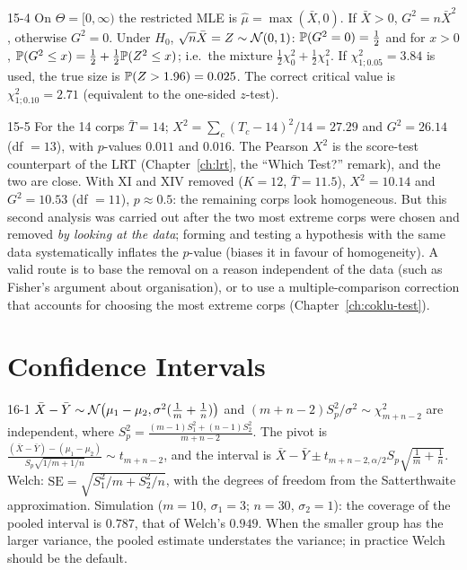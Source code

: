 \begin{solution}{15-4}
On $\Theta=[0,\infty)$ the restricted MLE is $\hat\mu=\max(\bar X,0)$. If $\bar X>0$, $G^2=n\bar X^2$, otherwise $G^2=0$. Under $H_0$, $\sqrt n\bar X=Z\sim\Normal(0,1)$: $\P(G^2=0)=\frac12$ and for $x>0$, $\P(G^2\le x)=\frac12+\frac12\P(Z^2\le x)$; i.e.\ the mixture $\frac12\chi^2_0+\frac12\chi^2_1$. If $\chi^2_{1;0.05}=3.84$ is used, the true size is $\P(Z>1.96)=0.025$. The correct critical value is $\chi^2_{1;0.10}=2.71$ (equivalent to the one-sided $z$-test).
\end{solution}

\begin{solution}{15-5}
For the 14 corps $\bar T=14$; $X^2=\sum_c(T_c-14)^2/14=27.29$ and $G^2=26.14$ (df $=13$), with $p$-values $0.011$ and $0.016$. The Pearson $X^2$ is the score-test counterpart of the LRT (Chapter~\ref{ch:lrt}, the ``Which Test?'' remark), and the two are close. With XI and XIV removed ($K=12$, $\bar T=11.5$), $X^2=10.14$ and $G^2=10.53$ (df $=11$), $p\approx0.5$: the remaining corps look homogeneous. But this second analysis was carried out after the two most extreme corps were chosen and removed \emph{by looking at the data}; forming and testing a hypothesis with the same data systematically inflates the $p$-value (biases it in favour of homogeneity). A valid route is to base the removal on a reason independent of the data (such as Fisher's argument about organisation), or to use a multiple-comparison correction that accounts for choosing the most extreme corps (Chapter~\ref{ch:coklu-test}).
\end{solution}

\section{Confidence Intervals}

\begin{solution}{16-1}
$\bar X-\bar Y\sim\Normal\big(\mu_1-\mu_2,\sigma^2(\frac1m+\frac1n)\big)$ and $(m+n-2)S_p^2/\sigma^2\sim\chi^2_{m+n-2}$ are independent, where $S_p^2=\frac{(m-1)S_1^2+(n-1)S_2^2}{m+n-2}$. The pivot is $\frac{(\bar X-\bar Y)-(\mu_1-\mu_2)}{S_p\sqrt{1/m+1/n}}\sim t_{m+n-2}$, and the interval is
$\bar X-\bar Y\pm t_{m+n-2,\alpha/2}S_p\sqrt{\frac1m+\frac1n}$.
Welch: $\mathrm{SE}=\sqrt{S_1^2/m+S_2^2/n}$, with the degrees of freedom from the Satterthwaite approximation. Simulation ($m=10$, $\sigma_1=3$; $n=30$, $\sigma_2=1$): the coverage of the pooled interval is $0.787$, that of Welch's $0.949$. When the smaller group has the larger variance, the pooled estimate understates the variance; in practice Welch should be the default.
\end{solution}

